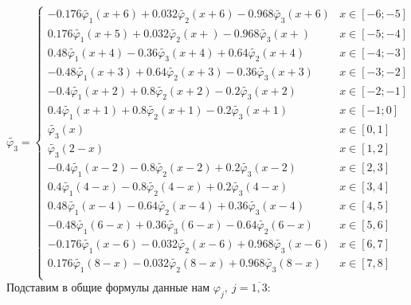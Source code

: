 \documentclass[a4paper, 12pt,fleqn]{extarticle}
\begin{document}
        \[
            \tilde{\varphi_3}=
            \begin{cases}
               -0.176 \tilde{\varphi_1}(x+6) + 0.032 \tilde{\varphi_2}(x+6) - 0.968 \tilde{\varphi_3}(x+6)&x\in[-6;-5]\\
               0.176 \tilde{\varphi_1}(x+5) + 0.032 \tilde{\varphi_2}(x+) - 0.968 \tilde{\varphi_3}(x+)&x\in[-5;-4]\\
               0.48 \tilde{\varphi_1}(x+4) - 0.36 \tilde{\varphi_3}(x+4) + 0.64 \tilde{\varphi_2}(x+4)&x\in[-4;-3] \\
               -0.48 \tilde{\varphi_1}(x+3) + 0.64 \tilde{\varphi_2}(x+3) - 0.36 \tilde{\varphi_3}(x+3)&x\in[-3;-2] \\
               -0.4 \tilde{\varphi_1}(x+2) + 0.8 \tilde{\varphi_2}(x+2) - 0.2 \tilde{\varphi_3}(x+2)&x\in[-2;-1]\\
               0.4 \tilde{\varphi_1}(x+1) + 0.8 \tilde{\varphi_2}(x+1) - 0.2 \tilde{\varphi_3}(x+1)&x\in[-1;0]\\
               \tilde{\varphi_3}(x)&x\in[0,1]\\
               \tilde{\varphi_3}(2-x)&x\in[1,2]\\
               -0.4 \tilde{\varphi_1}(x-2) - 0.8 \tilde{\varphi_2}(x-2) + 0.2 \tilde{\varphi_3}(x-2)&x\in[2,3]\\
               0.4 \tilde{\varphi_1}(4-x) - 0.8 \tilde{\varphi_2}(4-x) + 0.2 \tilde{\varphi_3}(4-x)&x\in[3,4]\\
               0.48 \tilde{\varphi_1}(x-4) - 0.64 \tilde{\varphi_2}(x-4) + 0.36 \tilde{\varphi_3}(x-4)&x\in[4,5] \\
               -0.48 \tilde{\varphi_1}(6-x) + 0.36 \tilde{\varphi_3}(6-x) - 0.64 \tilde{\varphi_2}(6-x)&x\in[5,6] \\
               -0.176 \tilde{\varphi_1}(x-6) - 0.032 \tilde{\varphi_2}(x-6) + 0.968 \tilde{\varphi_3}(x-6)&x\in[6,7]\\
               0.176 \tilde{\varphi_1}(8-x) - 0.032 \tilde{\varphi_2}(8-x) + 0.968 \tilde{\varphi_3}(8-x)&x\in[7,8]\\
            \end{cases}\]
Подставим в общие формулы данные нам $\varphi_j,\ j=\overline{1, 3}$:
\end{document}

